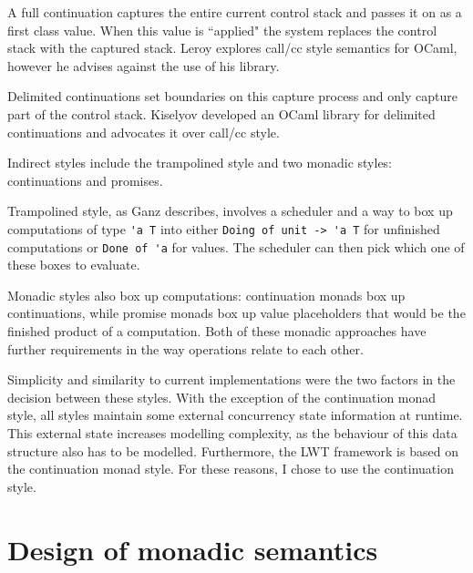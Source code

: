 \documentclass[12pt,twoside,notitlepage]{report}
\theoremstyle{plain}%
\theoremstyle{definition}
\theoremstyle{remark}
\begin{document}
A full continuation captures the entire current control stack and passes it on as a first class value. When this value is ``applied" the system replaces the control stack with the captured stack. Leroy\cite{leroyocaml} explores call/cc style semantics for OCaml, however he advises against the use of his library.

Delimited continuations set boundaries on this capture process and only capture part of the control stack. Kiselyov\cite{kiselyov2010delimited, kiselyov2012delimited} developed an OCaml library for delimited continuations and advocates it over call/cc style.

Indirect styles include the trampolined style and two monadic styles: continuations and promises. 

Trampolined style, as Ganz\cite{ganz1999trampolined} describes, involves a scheduler and a way to box up computations of type \lstinline|'a T| into either \lstinline|Doing of unit -> 'a T| for unfinished computations or \lstinline|Done of 'a| for values. The scheduler can then pick which one of these boxes to evaluate. 

Monadic styles also box up computations: continuation monads box up continuations\cite{Claessen99functionalpearls}, while promise monads\cite{liskov1988promises} box up value placeholders that would be the finished product of a computation. Both of these monadic approaches have further requirements in the way operations relate to each other.


Simplicity and similarity to current implementations were the two factors in the decision between these styles. With the exception of the continuation monad style, all styles maintain some external concurrency state information at runtime. This external state increases modelling complexity, as the behaviour of this data structure also has to be modelled. Furthermore, the LWT framework is based on the continuation monad style. For these reasons, I chose to use the continuation style.





\section{Design of monadic semantics}

%
\end{document}
